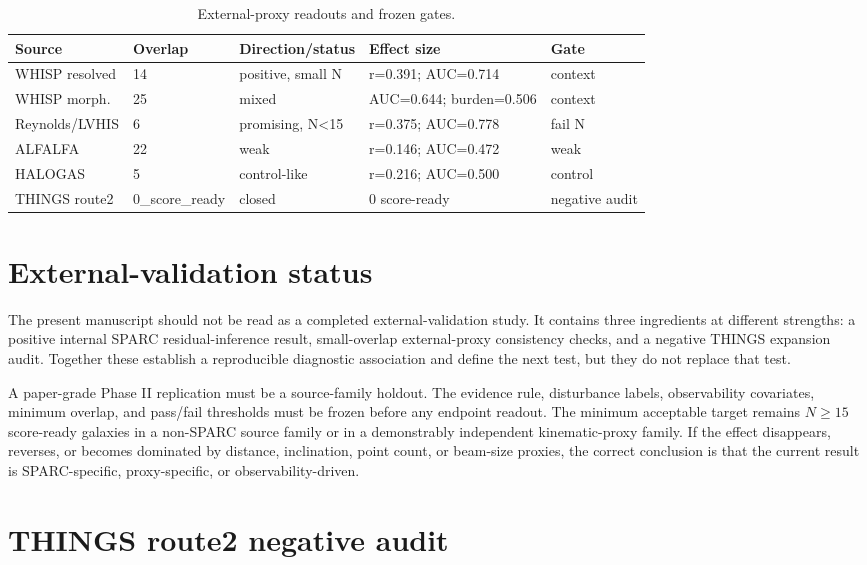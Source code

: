 \documentclass[11pt]{article}
\begin{document}
\begin{table}[H]
\centering
\caption{External-proxy readouts and frozen gates.}
\label{tab:external}
\footnotesize
\begin{tabular}{lllll}
\toprule
Source & Overlap & Direction/status & Effect size & Gate\\
\midrule
WHISP resolved & 14 & positive, small N & r=0.391; AUC=0.714 & context\\
WHISP morph. & 25 & mixed & AUC=0.644; burden=0.506 & context\\
Reynolds/LVHIS & 6 & promising, N<15 & r=0.375; AUC=0.778 & fail N\\
ALFALFA & 22 & weak & r=0.146; AUC=0.472 & weak\\
HALOGAS & 5 & control-like & r=0.216; AUC=0.500 & control\\
THINGS route2 & 0\_score\_ready & closed & 0 score-ready & negative audit\\
\bottomrule
\end{tabular}
\end{table}

\section{External-validation status}

The present manuscript should not be read as a completed external-validation study. It contains three ingredients at different strengths: a positive internal SPARC residual-inference result, small-overlap external-proxy consistency checks, and a negative THINGS expansion audit. Together these establish a reproducible diagnostic association and define the next test, but they do not replace that test.

A paper-grade Phase II replication must be a source-family holdout. The evidence rule, disturbance labels, observability covariates, minimum overlap, and pass/fail thresholds must be frozen before any endpoint readout. The minimum acceptable target remains $N\geq15$ score-ready galaxies in a non-SPARC source family or in a demonstrably independent kinematic-proxy family. If the effect disappears, reverses, or becomes dominated by distance, inclination, point count, or beam-size proxies, the correct conclusion is that the current result is SPARC-specific, proxy-specific, or observability-driven.

\section{THINGS route2 negative audit}
\end{document}
